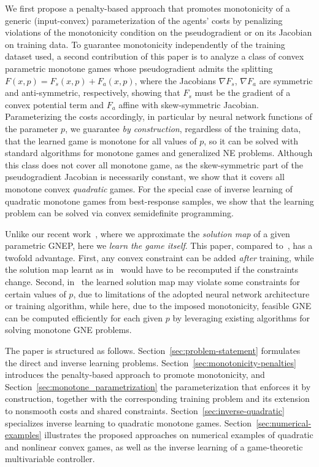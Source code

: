 \documentclass[11pt, a4paper]{article}
\theoremstyle{remark}
\theoremstyle{plain}
\begin{document}
We first propose a penalty-based approach that promotes monotonicity of a generic (input-convex) parameterization of the agents' costs by penalizing violations of the monotonicity condition on the pseudogradient or on its Jacobian on training data. To guarantee monotonicity independently of the training dataset used, a second contribution of this paper
is to analyze a class of convex parametric monotone games whose pseudogradient admits the splitting $F(x,p)=F_s(x,p)+F_a(x,p)$, where the Jacobians $\nabla F_s$, $\nabla F_a$ are symmetric and anti-symmetric, 
respectively, showing that $F_s$ must be the gradient of a convex potential term and $F_a$ affine with skew-symmetric Jacobian. Parameterizing the costs accordingly, in particular by neural network functions of the parameter $p$, we guarantee {\it by construction}, regardless of the training data, that the learned game is monotone for all values of $p$, so it can be solved with standard algorithms for monotone games and generalized NE problems. Although this class does not cover all monotone game, as the skew-symmetric part of the pseudogradient Jacobian is necessarily constant, we show that it covers all monotone convex {\it quadratic} games. For the special case of inverse learning of quadratic monotone games from best-response samples, we show that the learning problem can be solved via convex semidefinite programming.

Unlike our recent work~\cite{BT26}, where we approximate the {\it solution map} of a given parametric GNEP, here we {\it learn the game itself}.
This paper, compared to~\cite{BT26}, has a twofold advantage. First, any convex constraint can be added {\it after} training, while the solution map learnt as in~\cite{BT26} would have to be recomputed if the constraints change. Second, in~\cite{BT26} the learned solution map may violate some constraints for certain values of $p$, due to limitations of the adopted neural network architecture or training algorithm, while here, due to the imposed monotonicity, feasible GNE can be computed efficiently for each given $p$ by leveraging existing algorithms for solving monotone GNE problems. 

The paper is structured as follows. Section~\ref{sec:problem-statement} formulates the direct and inverse learning problems. Section~\ref{sec:monotonicity-penalties} introduces the penalty-based approach to promote monotonicity, and Section~\ref{sec:monotone_parametrization} the parameterization that enforces it by construction, together with the corresponding training problem and its extension to nonsmooth costs and shared constraints. Section~\ref{sec:inverse-quadratic} specializes inverse learning to quadratic monotone games. Section~\ref{sec:numerical-examples} illustrates the proposed approaches on numerical examples of quadratic and nonlinear convex games, as well as the inverse learning of a game-theoretic multivariable controller. 
\end{document}
